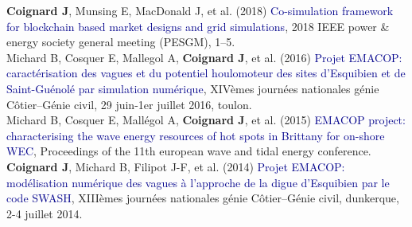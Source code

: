 \documentclass[11pt,a4paper,sans]{moderncv}        %
\begin{document}
\textbf{Coignard J}, Munsing E, MacDonald J, et al. (2018) \textcolor{darkblue}{Co-simulation framework for blockchain based market designs and grid simulations}, 2018 IEEE power \& energy society general meeting (PESGM), 1–5.\\

Michard B, Cosquer E, Mallegol A, \textbf{Coignard J}, et al. (2016) \textcolor{darkblue}{Projet EMACOP: caractérisation des vagues et du potentiel houlomoteur des sites d’Esquibien et de Saint-Guénolé par simulation numérique}, XIVèmes journées nationales génie Côtier–Génie civil, 29 juin-1er juillet 2016, toulon.\\

Michard B, Cosquer E, Mallégol A, \textbf{Coignard J}, et al. (2015) \textcolor{darkblue}{EMACOP project: characterising the wave energy resources of hot spots in Brittany for on-shore WEC}, Proceedings of the 11th european wave and tidal energy conference.\\

\textbf{Coignard J}, Michard B, Filipot J-F, et al. (2014) \textcolor{darkblue}{Projet EMACOP: modélisation numérique des vagues à l’approche de la digue d’Esquibien par le code SWASH}, XIIIèmes journées nationales génie Côtier–Génie civil, dunkerque, 2-4 juillet 2014.
\end{document}
